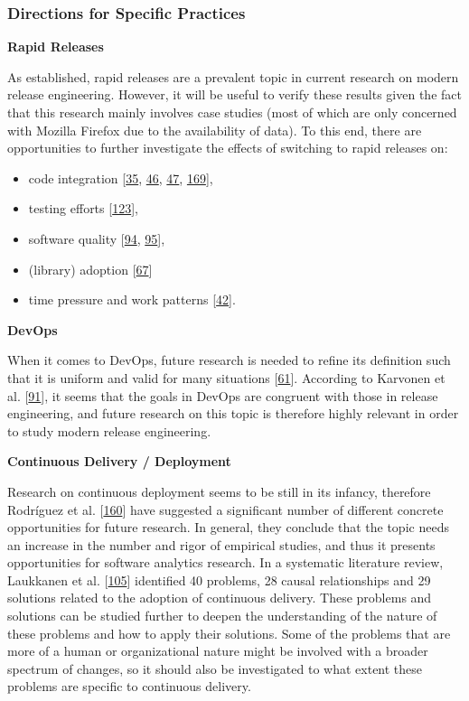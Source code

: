 \documentclass[]{book}
\providecommand{\tightlist}{%
  \setlength{\itemsep}{0pt}\setlength{\parskip}{0pt}}
\begin{document}
\subsubsection{Directions for Specific
Practices}\label{directions-for-specific-practices}

\textbf{Rapid Releases}

As established, rapid releases are a prevalent topic in current research
on modern release engineering. However, it will be useful to verify
these results given the fact that this research mainly involves case
studies (most of which are only concerned with Mozilla Firefox due to
the availability of data). To this end, there are opportunities to
further investigate the effects of switching to rapid releases on:

\begin{itemize}
\tightlist
\item
  code integration {[}\protect\hyperlink{ref-castelluccio2017a}{35},
  \protect\hyperlink{ref-da2014a}{46},
  \protect\hyperlink{ref-da2016a}{47},
  \protect\hyperlink{ref-souza2015a}{169}{]},
\item
  testing efforts {[}\protect\hyperlink{ref-mantyla2015a}{123}{]},
\item
  software quality {[}\protect\hyperlink{ref-khomh2015a}{94},
  \protect\hyperlink{ref-khomh2012a}{95}{]},
\item
  (library) adoption {[}\protect\hyperlink{ref-fujibayashi2017a}{67}{]}
\item
  time pressure and work patterns
  {[}\protect\hyperlink{ref-claes2017a}{42}{]}.
\end{itemize}

\textbf{DevOps}

When it comes to DevOps, future research is needed to refine its
definition such that it is uniform and valid for many situations
{[}\protect\hyperlink{ref-dyck2015a}{61}{]}. According to Karvonen et
al. {[}\protect\hyperlink{ref-karvonen2017a}{91}{]}, it seems that the
goals in DevOps are congruent with those in release engineering, and
future research on this topic is therefore highly relevant in order to
study modern release engineering.

\textbf{Continuous Delivery / Deployment}

Research on continuous deployment seems to be still in its infancy,
therefore Rodríguez et al.
{[}\protect\hyperlink{ref-rodriguez2017a}{160}{]} have suggested a
significant number of different concrete opportunities for future
research. In general, they conclude that the topic needs an increase in
the number and rigor of empirical studies, and thus it presents
opportunities for software analytics research. In a systematic
literature review, Laukkanen et al.
{[}\protect\hyperlink{ref-laukkanen2017a}{105}{]} identified 40
problems, 28 causal relationships and 29 solutions related to the
adoption of continuous delivery. These problems and solutions can be
studied further to deepen the understanding of the nature of these
problems and how to apply their solutions. Some of the problems that are
more of a human or organizational nature might be involved with a
broader spectrum of changes, so it should also be investigated to what
extent these problems are specific to continuous delivery.
\end{document}
